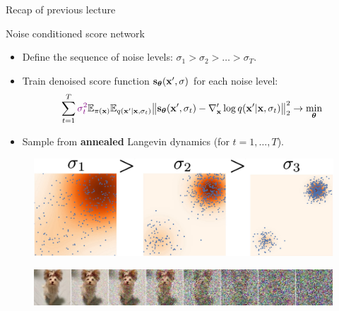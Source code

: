 \begin{frame}{Recap of previous lecture}
	\begin{block}{Noise conditioned score network}
		\begin{itemize}
			\item Define the sequence of noise levels: $\sigma_1 > \sigma_2 > \dots > \sigma_T$.
			\item Train denoised score function $\mathbf{s}_{\boldsymbol{\theta}}(\mathbf{x}', \sigma)$ for each noise level:
			\vspace{-0.3cm}
			\[
				\sum_{t=1}^T {\color{violet}\sigma_t^2} \mathbb{E}_{\pi(\mathbf{x})} \mathbb{E}_{q(\mathbf{x}' | \mathbf{x}, \sigma_t)}\bigl\| \mathbf{s}_{\boldsymbol{\theta}}(\mathbf{x}', \sigma_t) - \nabla_{\mathbf{x}}' \log q(\mathbf{x}' | \mathbf{x}, \sigma_t) \bigr\|^2_2 \rightarrow \min_{\boldsymbol{\theta}}
			\]
			\vspace{-0.5cm}
			\item Sample from \textbf{annealed} Langevin dynamics (for $t=1, \dots, T$).
		\end{itemize}
	\end{block}
	\begin{figure}
		\includegraphics[width=0.55\linewidth]{figs/multi_scale}
	\end{figure}
	\begin{figure}
		\includegraphics[width=\linewidth]{figs/duoduo}
	\end{figure}
\end{frame}

